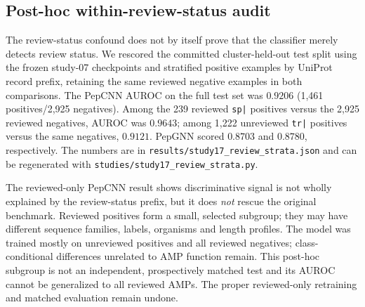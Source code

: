 \subsection{Post-hoc within-review-status audit}
\label{sec:reviewstrata}
The review-status confound does not by itself prove that the classifier
merely detects review status. We rescored the committed cluster-held-out
test split using the frozen study-07 checkpoints and stratified positive
examples by UniProt record prefix, retaining the same reviewed negative
examples in both comparisons. The PepCNN AUROC on the full test set was
$0.9206$ (1{,}461 positives/2{,}925 negatives). Among the 239 reviewed
\texttt{sp|} positives versus the 2{,}925 reviewed negatives, AUROC was
$0.9643$; among 1{,}222 unreviewed \texttt{tr|} positives versus the same
negatives, $0.9121$. PepGNN scored $0.8703$ and $0.8780$, respectively.
The numbers are in \texttt{results/study17\_review\_strata.json} and can
be regenerated with \texttt{studies/study17\_review\_strata.py}.

The reviewed-only PepCNN result shows discriminative signal is not wholly
explained by the review-status prefix, but it does \emph{not} rescue the
original benchmark. Reviewed positives form a small, selected subgroup;
they may have different sequence families, labels, organisms and length
profiles. The model was trained mostly on unreviewed positives and all
reviewed negatives; class-conditional differences unrelated to AMP
function remain. This post-hoc subgroup is not an independent, prospectively
matched test and its AUROC cannot be generalized to all reviewed AMPs.
The proper reviewed-only retraining and matched evaluation remain undone.
